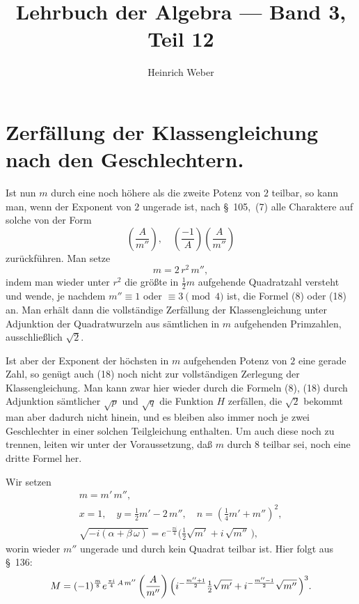 \documentclass[12pt,a4paper]{article}
\title{Lehrbuch der Algebra --- Band 3, Teil 12}
\author{Heinrich Weber}
\date{}
\theoremstyle{definition}
\begin{document}
\maketitle

\setcounter{section}{137}

\section{Zerfällung der Klassengleichung nach den Geschlechtern.}

Ist nun $m$ durch eine noch höhere als die zweite Potenz von $2$ teilbar, 
so kann man, wenn der Exponent von $2$ ungerade ist, nach \S~105,~(7) alle 
Charaktere auf solche von der Form
\[
\left(\frac{A}{m''}\right),\quad \left(\frac{-1}{A}\right)\left(\frac{A}{m''}\right)
\]
zurückführen. Man setze
\[
m = 2\, r^{2}\, m'',
\]
indem man wieder unter $r^{2}$ die größte in $\frac{1}{2}m$ aufgehende 
Quadratzahl versteht und wende, je nachdem $m'' \equiv 1$ oder $\equiv 3 \pmod 4$ 
ist, die Formel (8) oder (18) an. Man erhält dann die vollständige 
Zerfällung der Klassengleichung unter Adjunktion der Quadratwurzeln aus 
sämtlichen in $m$ aufgehenden Primzahlen, ausschließlich $\sqrt{2}$.

Ist aber der Exponent der höchsten in $m$ aufgehenden Potenz von $2$ eine 
gerade Zahl, so genügt auch (18) noch nicht zur vollständigen Zerlegung der 
Klassengleichung. Man kann zwar hier wieder durch die Formeln (8), (18) durch 
Adjunktion sämtlicher $\sqrt{p}$ und $\sqrt{q}$ die Funktion $H$ zerfällen, 
die $\sqrt{2}$ bekommt man aber dadurch nicht hinein, und es bleiben also 
immer noch je zwei Geschlechter in einer solchen Teilgleichung enthalten. 
Um auch diese noch zu trennen, leiten wir unter der Voraussetzung, daß $m$ 
durch $8$ teilbar sei, noch eine dritte Formel her.

Wir setzen
\begin{gather*}
m = m'\, m'',\\
x = 1,\quad y = \tfrac{1}{2}m' - 2\, m'',\quad n = (\tfrac{1}{4}m' + m'')^{2},\\
\sqrt{-i(\alpha + \beta\,\omega)} = e^{-\frac{\pi i}{4}}
\bigl(\tfrac{1}{2}\sqrt{m'} + i\,\sqrt{m''}\,\bigr),
\end{gather*}
worin wieder $m''$ ungerade und durch kein Quadrat teilbar ist. Hier folgt 
aus \S~136:
\begin{equation}
M = (-1)^{\frac{m}{8}} e^{\frac{\pi i}{4}\, A\, m''}
\left(\frac{A}{m''}\right)
\Bigl(i^{-\frac{m''+1}{2}}\tfrac{1}{2}\sqrt{m'} 
+ i^{-\frac{m''-1}{2}}\sqrt{m''}\,\Bigr)^{3}.
\end{equation}
\end{document}
